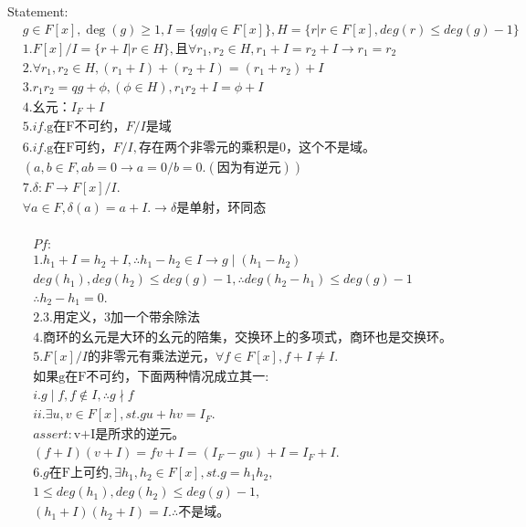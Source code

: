 \documentclass[12pt, a4paper]{article}  %
\begin{document}
Statement:\\
\begin{align}
    &g\in F[x],\deg(g)\geqslant 1,I=\{qg|q\in  F[x]\},H=\{r|r\in F[x],deg(r)\leqslant deg(g)-1\}\\
    &1.F[x]/I=\{r+I|r\in H\},\text{且}\forall r_1,r_2\in H,r_1+I=r_2+I\rightarrow r_1=r_2\\
    &2.\forall r_1,r_2\in H,(r_1+I)+(r_2+I)=(r_1+r_2)+I\\
    &3.r_1r_2=qg+\phi,(\phi\in H),r_1r_2+I=\phi+I\\
    &4.\text{幺元：}I_F+I\\
    &5.if.\text{g在F不可约，}F/I\text{是域}\\
    &6.if. \text{g在F可约，}F/I,\text{存在两个非零元的乘积是0，这个不是域。}\\
    &(a,b\in F,ab=0\rightarrow a=0 / b=0.(\text{因为有逆元}))\\
    &7.\delta :F\rightarrow F[x]/I.\\
    &\forall a\in F,\delta(a)=a+I.\rightarrow \delta \text{是单射，环同态}\\
\end{align}

\begin{align}
    &Pf:\\
    &1.h_1+ I=h_2+I,\therefore h_1-h_2\in I\rightarrow g \mid (h_1-h_2)\\
    &deg(h_1),deg(h_2)\leqslant deg(g)-1,\therefore deg(h_2-h_1)\leqslant deg(g)-1\\
    &\therefore h_2-h_1=0.\\
    &2.3.\text{用定义，3加一个带余除法}\\
    &4.\text{商环的幺元是大环的幺元的陪集，交换环上的多项式，商环也是交换环。}\\
    &5.F[x]/I\text{的非零元有乘法逆元，}\forall f\in F[x],f+I\neq I.\\
    &\text{如果g在F不可约，下面两种情况成立其一:}\\
    &i.g\mid f,f\notin I,\therefore g\nmid f\\
    &ii.\exists u,v\in F[x],st. gu+hv=I_F.\\
    &assert:\text{v+I是所求的逆元。}\\
    &(f+I)(v+I)=fv+I=(I_F-gu)+I=I_F+I.\\
    &6.g\text{在F上可约},\exists h_1,h_2\in F[x],st. g=h_1h_2,\\
    &1\leqslant deg(h_1),deg(h_2)\leqslant deg(g)-1,\\
    &(h_1+I)(h_2+I)=I.\therefore \text{不是域。}
\end{align}
\end{document}
